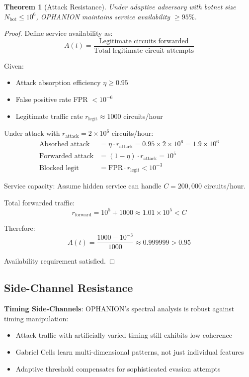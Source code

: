 \documentclass[11pt,a4paper]{article}
\newtheorem{theorem}{Theorem}[section]
\begin{document}
\begin{theorem}[Attack Resistance]
Under adaptive adversary with botnet size $N_{\text{bot}} \leq 10^6$, OPHANION maintains service availability $\geq 95\%$.
\end{theorem}

\begin{proof}
Define service availability as:
\begin{equation}
A(t) = \frac{\text{Legitimate circuits forwarded}}{\text{Total legitimate circuit attempts}}
\end{equation}

Given:
\begin{itemize}
\item Attack absorption efficiency $\eta \geq 0.95$
\item False positive rate FPR $< 10^{-6}$
\item Legitimate traffic rate $r_{\text{legit}} \approx 1000$ circuits/hour
\end{itemize}

Under attack with $r_{\text{attack}} = 2 \times 10^6$ circuits/hour:
\begin{align}
\text{Absorbed attack} &= \eta \cdot r_{\text{attack}} = 0.95 \times 2 \times 10^6 = 1.9 \times 10^6 \\
\text{Forwarded attack} &= (1 - \eta) \cdot r_{\text{attack}} = 10^5 \\
\text{Blocked legit} &= \text{FPR} \cdot r_{\text{legit}} < 10^{-3}
\end{align}

Service capacity: Assume hidden service can handle $C = 200{,}000$ circuits/hour.

Total forwarded traffic:
\begin{equation}
r_{\text{forward}} = 10^5 + 1000 \approx 1.01 \times 10^5 < C
\end{equation}

Therefore:
\begin{equation}
A(t) = \frac{1000 - 10^{-3}}{1000} \approx 0.999999 > 0.95
\end{equation}

Availability requirement satisfied.
\end{proof}

\subsection{Side-Channel Resistance}

\textbf{Timing Side-Channels}:
OPHANION's spectral analysis is robust against timing manipulation:
\begin{itemize}
\item Attack traffic with artificially varied timing still exhibits low coherence
\item Gabriel Cells learn multi-dimensional patterns, not just individual features
\item Adaptive threshold compensates for sophisticated evasion attempts
\end{itemize}
\end{document}
